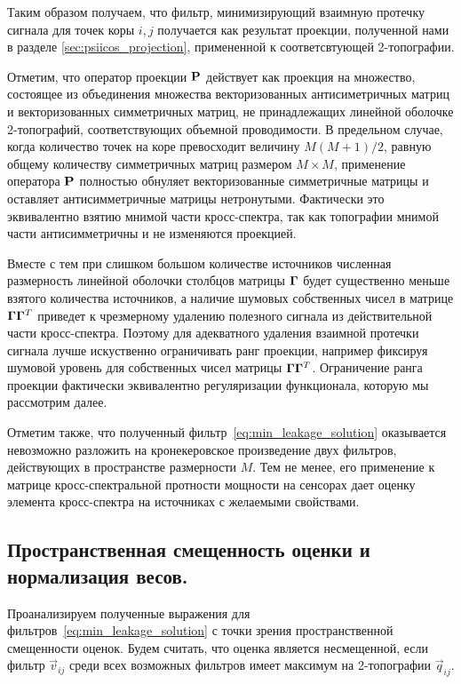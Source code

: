 Таким образом получаем, что фильтр, минимизирующий взаимную протечку сигнала
для точек коры $i, j$ получается как результат проекции, полученной нами в
разделе \ref{sec:psiicos_projection}, примененной к соответсвтующей
2-топографии.

Отметим, что оператор проекции $\mathbf{P}$ действует как проекция на множество,
состоящее из объединения множества векторизованных антисиметричных матриц и
векторизованных симметричных матриц, не принадлежащих линейной оболочке
2-топографий, соответствующих объемной проводимости. В предельном случае, когда
количество точек на коре превосходит величину $M (M + 1) / 2$, равную общему
количеству симметричных матриц размером $M \times M$, применение оператора
$\mathbf{P}$ полностью обнуляет векторизованные симметричные матрицы и оставляет
антисимметричные матрицы нетронутыми. Фактически это эквивалентно взятию
мнимой части кросс-спектра, так как топографии мнимой части антисимметричны и
не изменяются проекцией.

Вместе с тем при слишком большом количестве источников численная размерность
линейной оболочки столбцов матрицы $\mathbf{\Gamma}$ будет существенно меньше
взятого количества источников, а наличие шумовых собственных чисел в матрице
$\mathbf{\Gamma} \mathbf{\Gamma}^T$ приведет к чрезмерному удалению полезного
сигнала из действительной части кросс-спектра. Поэтому для адекватного удаления
взаимной протечки сигнала лучше искуственно ограничивать ранг проекции,
например фиксируя шумовой уровень для собственных чисел матрицы $\mathbf{\Gamma}
\mathbf{\Gamma}^T$. Ограничение ранга проекции фактически эквивалентно
регуляризации функционала, которую мы рассмотрим далее.

Отметим также, что полученный фильтр~\ref{eq:min_leakage_solution} оказывается
невозможно разложить на кронекеровское произведение двух фильтров, действующих
в пространстве размерности $M$. Тем не менее, его применение к матрице
кросс-спектральной протности мощности на сенсорах дает оценку элемента кросс-спектра на
источниках с желаемыми свойствами.

\subsection{Пространственная смещенность оценки и нормализация весов.}
\label{sec:psiicos_normalization_and_spatial_bias}

Проанализируем полученные выражения для фильтров~\ref{eq:min_leakage_solution}
с точки зрения пространственной смещенности оценок. Будем считать, что оценка
является несмещенной, если фильтр $\vec{v}_{ij}$ среди всех возможных фильтров
имеет максимум на 2-топографии $\vec{q}_{ij}$. 

